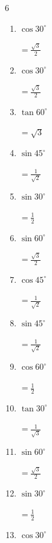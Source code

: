 \begin{multicols}{6}
\begin{enumerate}
  \item $\displaystyle \cos{30^\circ}$

        $\displaystyle =\frac{\sqrt{3}}{2}$

  \item $\displaystyle \cos{30^\circ}$

        $\displaystyle =\frac{\sqrt{3}}{2}$

  \item $\displaystyle \tan{60^\circ}$

        $\displaystyle =\sqrt{3}$

  \item $\displaystyle \sin{45^\circ}$

        $\displaystyle =\frac{1}{\sqrt{2}}$

  \item $\displaystyle \sin{30^\circ}$

        $\displaystyle =\frac{1}{2}$

  \item $\displaystyle \sin{60^\circ}$

        $\displaystyle =\frac{\sqrt{3}}{2}$

  \item $\displaystyle \cos{45^\circ}$

        $\displaystyle =\frac{1}{\sqrt{2}}$

  \item $\displaystyle \sin{45^\circ}$

        $\displaystyle =\frac{1}{\sqrt{2}}$

  \item $\displaystyle \cos{60^\circ}$

        $\displaystyle =\frac{1}{2}$

\columnbreak %

  \item $\displaystyle \tan{30^\circ}$

        $\displaystyle =\frac{1}{\sqrt{3}}$

  \item $\displaystyle \sin{60^\circ}$

        $\displaystyle =\frac{\sqrt{3}}{2}$

  \item $\displaystyle \sin{30^\circ}$

        $\displaystyle =\frac{1}{2}$

  \item $\displaystyle \cos{30^\circ}$


\end{enumerate}
\end{multicols}
